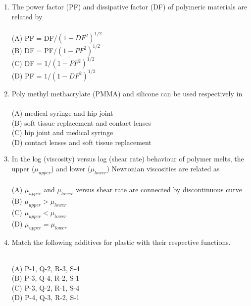 \documentclass[journal,12pt,onecolumn]{IEEEtran}
\begin{document}
\begin{enumerate}[label=\arabic*)]
\item The power factor (PF) and dissipative factor (DF) of polymeric materials are related by\\
\vspace{0.2cm}
\hfill{} \\
(A) PF = DF/$(1 - DF^2)^{1/2}$\\
(B) DF = PF/$(1 - PF^2)^{1/2}$\\
(C) DF = $1/(1 - PF^2)^{1/2}$\\
(D) PF = $1/(1 - DF^2)^{1/2}$
\vspace{0.5cm}

\item Poly methyl methacrylate (PMMA) and silicone can be used respectively in\\
\vspace{0.2cm}
\hfill{} \\
(A) medical syringe and hip joint\\
(B) soft tissue replacement and contact lenses\\
(C) hip joint and medical syringe\\
(D) contact lenses and soft tissue replacement
\vspace{0.5cm}

\item In the log (viscosity) versus log (shear rate) behaviour of polymer melts, the upper ($\mu_{upper}$) and lower ($\mu_{lower}$) Newtonian viscosities are related as\\
\vspace{0.2cm}
\hfill{} \\
(A) $\mu_{upper}$ and $\mu_{lower}$ versus shear rate are connected by discontinuous curve\\
(B) $\mu_{upper} > \mu_{lower}$\\
(C) $\mu_{upper} < \mu_{lower}$\\
(D) $\mu_{upper} = \mu_{lower}$
\vspace{0.5cm}

\item Match the following additives for plastic with their respective functions.



\vspace{0.2cm}
\hfill{} \\

(A) P-1, Q-2, R-3, S-4\\
(B) P-3, Q-4, R-2, S-1\\
(C) P-3, Q-2, R-1, S-4\\
(D) P-4, Q-3, R-2, S-1
\vspace{0.5cm}


\end{enumerate}
\end{document}
